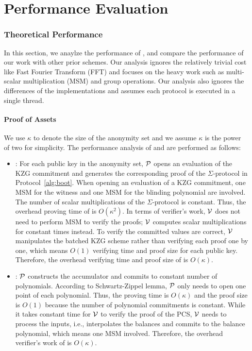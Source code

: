 \chapter{Performance Evaluation}

\subsection{Theoretical Performance}

In this section, we anaylze the performance of \Sys, and compare the performance of our work with other prior schemes. Our analysis ignores the relatively trivial cost like Fast Fourier Transform (FFT) and focuses on the heavy work such as multi-scalar multiplication (MSM) and group operations. Our analysis also ignores the differences of the implementations and assumes each protocol is executed in a single thread.
\subsubsection{Proof of Assets}

We use $\kappa$ to denote the size of the anonymity set and we assume $\kappa$ is the power of two for simplicity. The performance analysis of \bootstrap and \userproof are performed as follows:
\begin{itemize}

\item \bootstrap: For each public key in the anonymity set, $\mathcal{P}$ opens an evaluation of the KZG commitment and generates the corresponding proof of the $\Sigma$-protocol in Protocol~\ref{alg:boot}. When opening an evaluation of a KZG commitment, one MSM for the witness and one MSM for the blinding polynomial are involved. The number of scalar multiplications of the $\Sigma$-protocol is constant. Thus, the overhead proving time of \bootstrap is $O(\kappa^2)$. In terms of verifier's work, $\mathcal{V}$ does not need to perform MSM to verify the proofs; $\mathcal{V}$ computes scalar multiplications for constant times instead. To verify the committed values are correct, $\mathcal{V}$ manipulates the batched KZG scheme rather than verifying each proof one by one, which means $O(1)$ verifying time and proof size for each public key. Therefore, the overhead verifying time and proof size of \bootstrap is $O(\kappa)$.

\item \poa: $\mathcal{P}$ constructs the accumulator and commits to constant number of polynomials. According to Schwartz-Zippel lemma, $\mathcal{P}$ only needs to open one point of each polynomial. Thus, the proving time is $O(\kappa)$ and the proof size is $O(1)$ because the number of polynomial commitments is constant. While it takes constant time for $\mathcal{V}$ to verify the proof of the PCS, $\mathcal{V}$ needs to process the inputs, i.e., interpolates the balances and commits to the balance polynomial, which means one MSM involved. Therefore, the overhead verifier's work of \poa is $O(\kappa)$.

\end{itemize}

